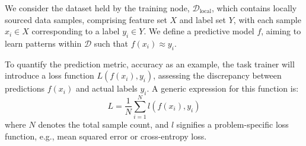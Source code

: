 \documentclass[conference]{IEEEtran}
\begin{document}



We consider the dataset held by the training node, \(\mathcal{D}_{\text{local}}\), which contains locally sourced data samples, comprising feature set \(X\) and label set \(Y\), with each sample \(x_i \in X\) corresponding to a label \(y_i \in Y\). We define a predictive model \(f\), aiming to learn patterns within \(\mathcal{D}\) such that \(f(x_i) \approx y_i\).

To quantify the prediction metric, accuracy as an example, the task trainer will introduce a loss function \(L(f(x_i), y_i)\), assessing the discrepancy between predictions \(f(x_i)\) and actual labels \(y_i\). A generic expression for this function is:
\begin{equation*}
L = \frac{1}{N} \sum_{i=1}^{N} l(f(x_i), y_i) 
\end{equation*}
where \(N\) denotes the total sample count, and \(l\) signifies a problem-specific loss function, e.g., mean squared error or cross-entropy loss.
\end{document}
